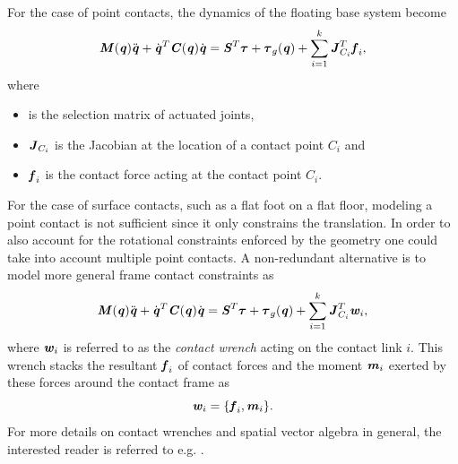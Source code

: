 For the case of point contacts, the dynamics of the floating base system become
\begin{equation*} \label{eqn:EoMLeggedRobotPtContact}
\bm{\mathit{M}}(\bm{\mathit{q}})\ddot{\bm{\mathit{q}}}+\dot{\bm{\mathit{q}}}^T\bm{\mathit{C}}(\bm{\mathit{q}})\dot{\bm{\mathit{q}}}=\bm{\mathit{S}}^T\bm{\mathit{\tau}}+\bm{\mathit{\tau}}_g(\bm{\mathit{q}})+\sum_{i=1}^{k}\bm{\mathit{J}}_{C_i}^T\bm{\mathit{f}}_i,
\end{equation*}
where 
\begin{itemize}
\item {} is the selection matrix of actuated joints,
\item $\bm{\mathit{J}}_{C_i}$ is the Jacobian at the location of a contact point $C_i$ and
\item $\bm{\mathit{f}}_i$ is the contact force acting at the contact point $C_i$.
\end{itemize}
For the case of surface contacts, such as a flat foot on a flat floor, modeling a point contact is not sufficient since it only constrains the translation. In order to also account for the rotational constraints enforced by the geometry one could take into account multiple point contacts. A non-redundant alternative is to model more general frame contact constraints as
\begin{equation*} \label{eqn:EoMLeggedRobotSurfaceContact}
\bm{\mathit{M}}(\bm{\mathit{q}})\ddot{\bm{\mathit{q}}}+\dot{\bm{\mathit{q}}}^T\bm{\mathit{C}}(\bm{\mathit{q}})\dot{\bm{\mathit{q}}}=\bm{\mathit{S}}^T\bm{\mathit{\tau}}+\bm{\mathit{\tau}}_g(\bm{\mathit{q}})+\sum_{i=1}^{k}\bm{\mathit{J}}_{C_i}^T\bm{\mathit{w}}_i,
\end{equation*}
where $\bm{\mathit{w}}_i$ is referred to as the \textit{contact wrench} acting on the contact link $i$. This wrench stacks the resultant $\bm{\mathit{f}}_i$ of contact forces and the moment $\bm{\mathit{m}}_i$ exerted by these forces around the contact frame as
$$\bm{\mathit{w}}_i=\{\bm{\mathit{f}}_i,\bm{\mathit{m}}_i\}.$$ 
For more details on contact wrenches and spatial vector algebra in general, the interested reader is referred to e.g. \cite[Ch.2]{featherstone2014rigid}.

